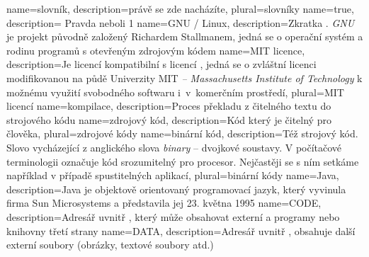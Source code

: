 {
  name={slovník},
  description={právě se zde nacházíte},
  plural={slovníky}
}
{
  name={true},
  description={\hspace{1mm} Pravda neboli 1}
}
{
  name={GNU / Linux},
  description={Zkratka . {\em GNU} je projekt původně založený Richardem Stallmanem, jedná se o operační systém a rodinu programů s otevřeným zdrojovým kódem}
}
{
  name={MIT licence},
  description={Je licencí kompatibilní s licencí , jedná se o zvlášt\-ní licenci modifikovanou na půdě Univerzity MIT {\em -- Massachusetts \linebreak Institute of Technology} k možnému využití svobodného softwaru \linebreak i~v~komerčním prostředí},
  plural={MIT licencí}
}
{
	name={kompilace},
	description={Proces překladu z čitelného textu do strojového kódu}
}
{
	name={zdrojový kód},
	description={Kód který je čitelný pro člověka},
	plural={zdrojové kódy}
}
{
	name={binární kód},
	description={Též strojový kód. Slovo vycházející z anglického slova {\em binary} -- dvojkové soustavy. V počítačové terminologii označuje kód srozumitelný pro procesor. Nejčastěji se s ním setkáme například v případě spustitelných aplikací},
	plural={binární kódy}
}
{
	name={Java},
	description={Java je objektově orientovaný programovací jazyk, který vyvinula firma Sun Microsystems a představila jej 23. května 1995}
}
{
	name={CODE},
	description={Adresář uvnitř , který může obsahovat externí  a  programy nebo knihovny třetí strany}
}
{
	name={DATA},
	description={Adresář uvnitř , obsahuje další externí soubory (obráz\-ky, textové soubory atd.)}
}



